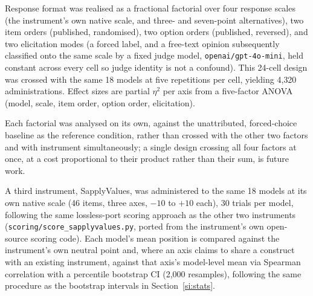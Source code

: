 \documentclass[11pt]{article}
\begin{document}
Response format was realised as a fractional factorial over four response
scales (the instrument's own native scale, and three- and seven-point
alternatives), two item orders (published, randomised), two option orders
(published, reversed), and two elicitation modes (a forced label, and a
free-text opinion subsequently classified onto the same scale by a fixed
judge model, \texttt{openai/gpt-4o-mini}, held constant across every cell so
judge identity is not a confound). This 24-cell design was crossed with the
same 18 models at five repetitions per cell, yielding 4{,}320
administrations. Effect sizes are partial $\eta^2$ per axis from a
five-factor ANOVA (model, scale, item order, option order, elicitation).

Each factorial was analysed on its own, against the unattributed,
forced-choice baseline as the reference condition, rather than crossed with
the other two factors and with instrument simultaneously; a single design
crossing all four factors at once, at a cost proportional to their product
rather than their sum, is future work.

A third instrument, SapplyValues, was administered to the same 18 models at
its own native scale (46 items, three axes, $-10$ to $+10$ each), 30 trials
per model, following the same lossless-port scoring approach as the other
two instruments (\texttt{scoring/score\_sapplyvalues.py}, ported from the
instrument's own open-source scoring code). Each model's mean position is
compared against the instrument's own neutral point and, where an axis
claims to share a construct with an existing instrument, against that
axis's model-level mean via Spearman correlation with a percentile bootstrap
CI (2{,}000 resamples), following the same procedure as the bootstrap
intervals in Section~\ref{si:stats}.
\end{document}
